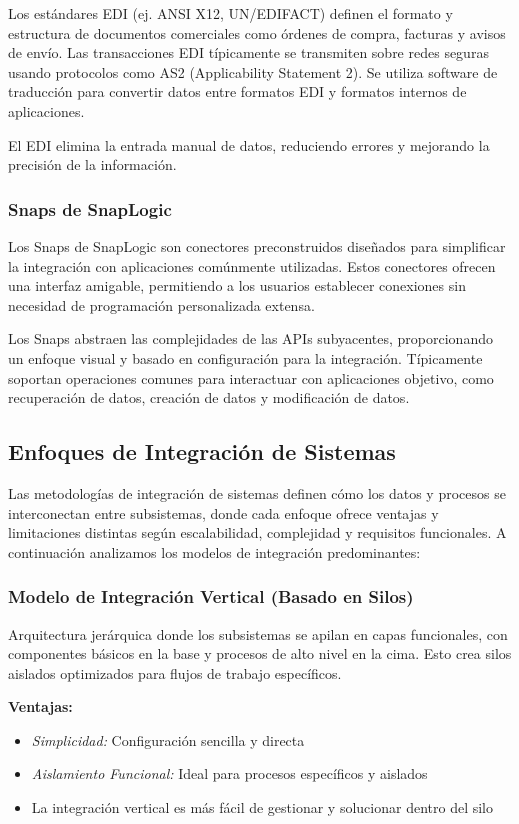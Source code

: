 \documentclass[12pt]{book}
\begin{document}
Los estándares EDI (ej. ANSI X12, UN/EDIFACT) definen el formato y estructura de documentos comerciales como órdenes de compra, facturas y avisos de envío. Las transacciones EDI típicamente se transmiten sobre redes seguras usando protocolos como AS2 (Applicability Statement 2). Se utiliza software de traducción para convertir datos entre formatos EDI y formatos internos de aplicaciones.

El EDI elimina la entrada manual de datos, reduciendo errores y mejorando la precisión de la información.

\subsubsection{Snaps de SnapLogic}
Los Snaps de SnapLogic son conectores preconstruidos diseñados para simplificar la integración con aplicaciones comúnmente utilizadas. Estos conectores ofrecen una interfaz amigable, permitiendo a los usuarios establecer conexiones sin necesidad de programación personalizada extensa.

Los Snaps abstraen las complejidades de las APIs subyacentes, proporcionando un enfoque visual y basado en configuración para la integración. Típicamente soportan operaciones comunes para interactuar con aplicaciones objetivo, como recuperación de datos, creación de datos y modificación de datos.

\subsection{Enfoques de Integración de Sistemas}
Las metodologías de integración de sistemas definen cómo los datos y procesos se interconectan entre subsistemas, donde cada enfoque ofrece ventajas y limitaciones distintas según escalabilidad, complejidad y requisitos funcionales. A continuación analizamos los modelos de integración predominantes:

\subsubsection{Modelo de Integración Vertical (Basado en Silos)}
Arquitectura jerárquica donde los subsistemas se apilan en capas funcionales, con componentes básicos en la base y procesos de alto nivel en la cima. Esto crea silos aislados optimizados para flujos de trabajo específicos.

\textbf{Ventajas:}
\begin{itemize}
\item \textit{Simplicidad:} Configuración sencilla y directa
\item \textit{Aislamiento Funcional:} Ideal para procesos específicos y aislados
\item La integración vertical es más fácil de gestionar y solucionar dentro del silo
\end{itemize}
\end{document}
